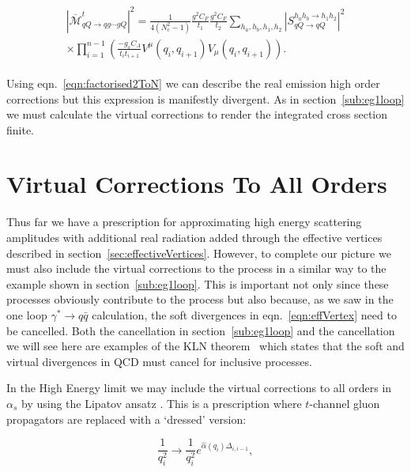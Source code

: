 	\begin{align}
	\begin{split}
		|\overline{\mathcal{M}}^t_{qQ\rightarrow qg\cdots gQ}|^2 = \frac{1}{4(N_c^2-1)}
		\frac{g^2C_F}{t_1}\frac{g^2C_F}{t_2} \sum_{h_a, h_b, h_1, h_2}
		|S_{qQ\rightarrow qQ}^{h_ah_b\rightarrow h_1h_2}|^2\\
		\times\prod_{i=1}^{n-1}\left(\frac{-g_sC_A}{t_it_{i+1}}V^\mu(q_i, q_{i+1})V_\mu(q_i, q_{i+1})\right).
		\label{eqn:factorised2ToN}
	\end{split}
	\end{align}

	Using eqn.~\eqref{eqn:factorised2ToN} we can describe the real emission high order
	corrections but this expression is manifestly divergent.  As in section~\ref{sub:eg1loop}
	we must calculate the virtual corrections to render the integrated cross section finite.

\section{Virtual Corrections To All Orders}
	\label{sub:virtuals}

	Thus far we have a prescription for approximating high energy scattering amplitudes with additional
	real radiation added through the effective vertices described in section~\eqref{sec:effectiveVertices}.
	However, to complete our picture we must also include the virtual corrections to the process in
	a similar way to the example shown in section~\eqref{sub:eg1loop}.  This is important
	not only since these processes obviously contribute to the process but also because, as we saw in
	the one loop $\gamma^*\to q\bar{q}$ calculation, the soft divergences in eqn.~\eqref{eqn:effVertex}
	need to be cancelled.  Both the cancellation in section~\eqref{sub:eg1loop} and the cancellation
	we will see here are examples of the KLN theorem~\cite{mutaBook} which states that the soft and virtual
	divergences in QCD must cancel for inclusive processes.

	In the High Energy limit we may include the virtual corrections to all orders in $\alpha_s$ by using
	the Lipatov ansatz \cite{Kuraev:1976ge}.  This is a prescription where $t$-channel gluon propagators
	are replaced with a `dressed' version:

	\begin{equation}
		\frac{1}{q_i^2}\rightarrow\frac{1}{q_i^2}e^{\hat{\alpha}(q_i)\Delta_{i,i-1}},
		\label{eqn:lipAns}
	\end{equation}

